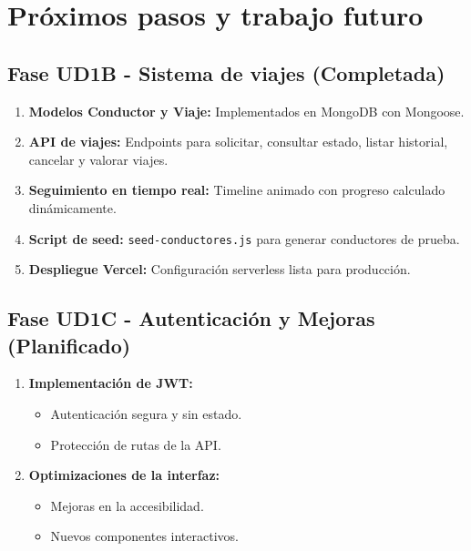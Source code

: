 \documentclass[12pt,a4paper]{article}
\begin{document}
\newpage

\section{Próximos pasos y trabajo futuro}

\subsection{Fase UD1B - Sistema de viajes (\textbf{Completada})}

\begin{enumerate}
    \item \textbf{Modelos Conductor y Viaje:} \checkmark Implementados en MongoDB con Mongoose.
    \item \textbf{API de viajes:} \checkmark Endpoints para solicitar, consultar estado, listar historial, cancelar y valorar viajes.
    \item \textbf{Seguimiento en tiempo real:} \checkmark Timeline animado con progreso calculado dinámicamente.
    \item \textbf{Script de seed:} \checkmark \texttt{seed-conductores.js} para generar conductores de prueba.
    \item \textbf{Despliegue Vercel:} \checkmark Configuración serverless lista para producción.
\end{enumerate}

\subsection{Fase UD1C - Autenticación y Mejoras (Planificado)}

\begin{enumerate}
    \item \textbf{Implementación de JWT:}
    \begin{itemize}
        \item Autenticación segura y sin estado.
        \item Protección de rutas de la API.
    \end{itemize}
    
    \item \textbf{Optimizaciones de la interfaz:}
    \begin{itemize}
        \item Mejoras en la accesibilidad.
        \item Nuevos componentes interactivos.
    \end{itemize}
\end{enumerate}
\end{document}
